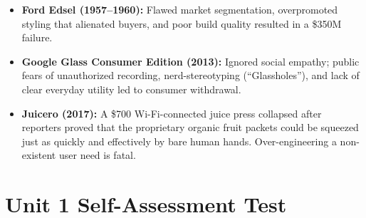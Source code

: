 \begin{example}
\begin{itemize}[leftmargin=1.2em, itemsep=3pt]
    \item \textbf{Ford Edsel (1957--1960):} Flawed market segmentation, overpromoted styling that alienated buyers, and poor build quality resulted in a \$350M failure.
    \item \textbf{Google Glass Consumer Edition (2013):} Ignored social empathy; public fears of unauthorized recording, nerd-stereotyping (``Glassholes''), and lack of clear everyday utility led to consumer withdrawal.
    \item \textbf{Juicero (2017):} A \$700 Wi-Fi-connected juice press collapsed after reporters proved that the proprietary organic fruit packets could be squeezed just as quickly and effectively by bare human hands. Over-engineering a non-existent user need is fatal.
\end{itemize}
\end{example}

\section{Unit 1 Self-Assessment Test}

